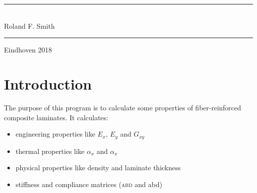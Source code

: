\documentclass[a4paper,landscape,oneside,11pt,twocolumn]{memoir}
\title{\TheTitle}
\author{Roland F. Smith}
\date{\TheDate}
\begin{document}
\tightlists
\hangcaption
\captiontitlefont{\small}
\doccoltocetc

\nonzeroparskip
\setlength{\parindent}{0pt}
\setbeforesecskip{5pt}
\setaftersecskip{1pt}
\setbeforesubsecskip{5pt}
\setaftersubsecskip{1pt}

\begin{titlingpage}
  \setlength{\parindent}{0pt} %
  \rule{\linewidth}{1mm}\vspace{5pt}
  \begin{flushright}
      {\Huge \TheTitle}\\[5mm]
      {\huge Roland F. Smith}
  \end{flushright}
  \rule{\linewidth}{1mm}
  \begin{center}
    \Large Eindhoven 2018
  \end{center}
\end{titlingpage}

\setcounter{page}{2}
\pagestyle{logboek}

\begin{KeepFromToc}
\tableofcontents
\end{KeepFromToc}
\clearpage

\setcounter{secnumdepth}{1}

\chapter{Introduction} %

The purpose of this program is to calculate some properties of
fiber-reinforced composite laminates. It calculates:
\begin{itemize}
    \item engineering properties like $E_x$, $E_y$ and $G_{xy}$
    \item thermal properties like $\alpha_x$ and $\alpha_x$
    \item physical properties like density and laminate thickness
    \item stiffness and compliance matrices (\textsc{abd}  and abd)
\end{itemize}
\end{document}
